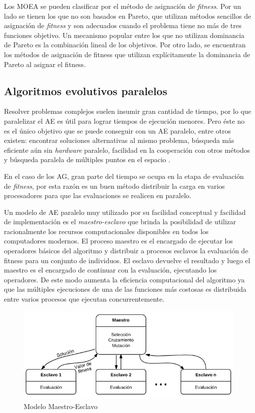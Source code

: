 Los MOEA se pueden clasificar por el método de asignación de \emph{fitness}. Por un lado se tienen los que no son basados en Pareto, que utilizan métodos sencillos de asignación de \emph{fitness} y son adecuados cuando el problema tiene no más de tres funciones objetivo. Un mecanismo popular entre los que no utilizan dominancia de Pareto es la combinación lineal de los objetivos. Por otro lado, se encuentran los métodos de asignación de fitness que utilizan explícitamente la dominancia de Pareto al asignar el fitness.




\subsection{Algoritmos evolutivos paralelos}
Resolver problemas complejos suelen insumir gran cantidad de tiempo, por lo que paralelizar el AE es útil para lograr tiempos de ejecución menores. Pero éste no es el único objetivo que se puede conseguir con un AE paralelo, entre otros existen: encontrar soluciones alternativas al mismo problema, búsqueda más eficiente aún sin \emph{hardware} paralelo, facilidad en la cooperación con otros métodos y búsqueda paralela de múltiples puntos en el espacio \citep{Alba2002}. 

En el caso de los AG, gran parte del tiempo se ocupa en la etapa de evaluación de \emph{fitness}, por esta razón es un buen método distribuir la carga en varios procesadores para que las evaluaciones se realicen en paralelo. 

Un modelo de AE paralelo muy utilizado por su facilidad conceptual y facilidad de implementación es el \emph{maestro-esclavo} que brinda la posibilidad de utilizar racionalmente los recursos computacionales disponibles en todos los computadores modernos. El proceso maestro es el encargado de ejecutar los operadores básicos del algoritmo y distribuir a procesos esclavos la evaluación de  fitness para un conjunto de individuos. El esclavo devuelve el resultado y luego el maestro es el encargado de continuar con la evaluación, ejecutando los operadores. De este modo aumenta la eficiencia computacional del algoritmo ya que las múltiples ejecuciones de una de las funciones más costosas es distribuida entre varios procesos que ejecutan concurrentemente.

\begin{figure}[ht]
	\centering
	\includegraphics[width=0.9\linewidth]{Figures/diagrama-master-slave}
	\caption[Modelo Maestro-Esclavo]{Modelo Maestro-Esclavo}
	\label{fig:diagrama-master-slave}
\end{figure}

